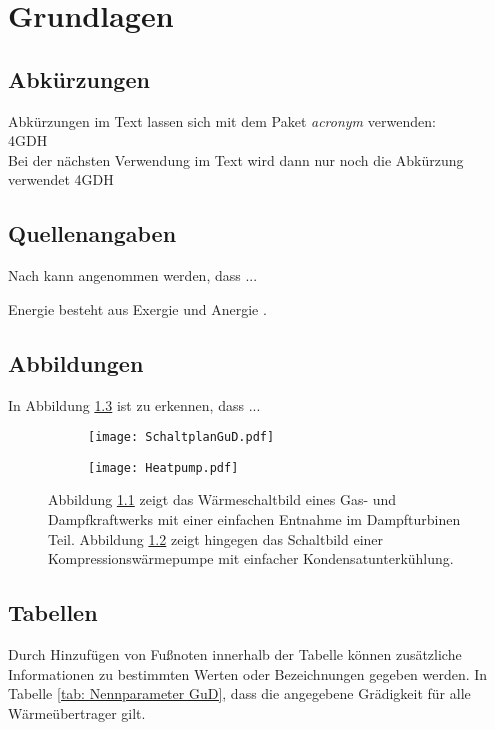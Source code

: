 \chapter{Grundlagen}\label{chapter: Grundlagen}	

	\section{Abkürzungen}
	Abkürzungen im Text lassen sich mit dem Paket \textit{acronym} verwenden:\\ 
	\ac{4GDH}\\ 
	Bei der nächsten Verwendung im Text wird dann nur noch die Abkürzung verwendet \ac{4GDH}
	
	
	\section{Quellenangaben}
	Nach \citet{WINTERSCHEID2017579} kann angenommen werden, dass ...
	
	Energie besteht aus Exergie und Anergie \cite{Baehr2012}.
	
	
	\section{Abbildungen}
	In Abbildung \ref{fig: Abbildung X} ist zu erkennen, dass ... 
	\begin{figure}[ht]
		\begin{subfigure}[b]{0.49\textwidth}
			\texttt{[image: SchaltplanGuD.pdf]}
			\label{subfigure: Schaltplan_GuD}
		\end{subfigure}
		\hfill
		\begin{subfigure}[b]{0.49\textwidth}
			\texttt{[image: Heatpump.pdf]}
			\label{subfigure: Schaltbild_Heatpump}
		\end{subfigure}
		\caption[Gegenüberstellung Gas- und Dampfkraftwerk mit Wärmepumpe]{Abbildung \ref{subfigure: Schaltplan_GuD} zeigt das Wärmeschaltbild eines Gas- und Dampfkraftwerks mit einer einfachen Entnahme im Dampfturbinen Teil. Abbildung \ref{subfigure: Schaltbild_Heatpump} zeigt hingegen das Schaltbild einer Kompressionswärmepumpe mit einfacher Kondensatunterkühlung.}
		\label{fig: Abbildung X}
	\end{figure}
	
	
	\section{Tabellen}
	Durch Hinzufügen von Fußnoten innerhalb der Tabelle können zusätzliche Informationen zu bestimmten Werten oder Bezeichnungen gegeben werden. In Tabelle \ref{tab: Nennparameter GuD}, dass die angegebene Grädigkeit für alle Wärmeübertrager gilt.
	
